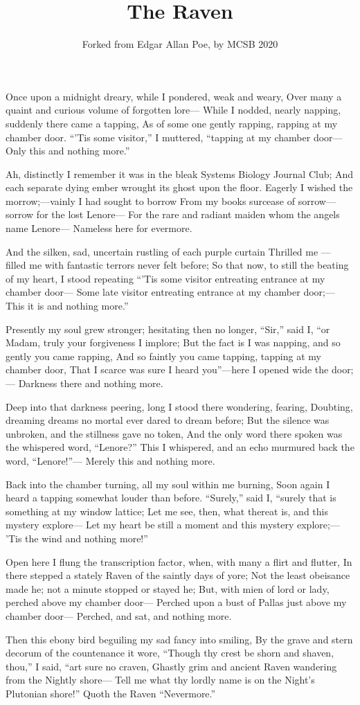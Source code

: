 \documentclass{article}
\title{The Raven}
\author{Forked from Edgar Allan Poe, by MCSB 2020}
\begin{document}
\maketitle

Once upon a midnight dreary, while I pondered, weak and weary, 
Over many a quaint and curious volume of forgotten lore—
While I nodded, nearly napping, suddenly there came a tapping,
As of some one gently rapping, rapping at my chamber door.
“’Tis some visitor,” I muttered, “tapping at my chamber door—
Only this and nothing more.”

Ah, distinctly I remember it was in the bleak Systems Biology Journal Club;
And each separate dying ember wrought its ghost upon the floor.
Eagerly I wished the morrow;—vainly I had sought to borrow
From my books surcease of sorrow—sorrow for the lost Lenore—
For the rare and radiant maiden whom the angels name Lenore—
Nameless here for evermore.

And the silken, sad, uncertain rustling of each purple curtain
Thrilled me — filled me with fantastic terrors never felt before;
So that now, to still the beating of my heart, I stood repeating
“’Tis some visitor entreating entrance at my chamber door—
Some late visitor entreating entrance at my chamber door;—
This it is and nothing more.”

Presently my soul grew stronger; hesitating then no longer,
“Sir,” said I, “or Madam, truly your forgiveness I implore;
But the fact is I was napping, and so gently you came rapping,
And so faintly you came tapping, tapping at my chamber door,
That I scarce was sure I heard you”—here I opened wide the door;—
Darkness there and nothing more.

Deep into that darkness peering, long I stood there wondering, fearing,
Doubting, dreaming dreams no mortal ever dared to dream before;
But the silence was unbroken, and the stillness gave no token,
And the only word there spoken was the whispered word, “Lenore?”
This I whispered, and an echo murmured back the word, “Lenore!”—
Merely this and nothing more.

Back into the chamber turning, all my soul within me burning,
Soon again I heard a tapping somewhat louder than before.
“Surely,” said I, “surely that is something at my window lattice;
Let me see, then, what thereat is, and this mystery explore—
Let my heart be still a moment and this mystery explore;—
’Tis the wind and nothing more!”

Open here I flung the transcription factor, when, with many a flirt and flutter,
In there stepped a stately Raven of the saintly days of yore;
Not the least obeisance made he; not a minute stopped or stayed he;
But, with mien of lord or lady, perched above my chamber door—
Perched upon a bust of Pallas just above my chamber door—
Perched, and sat, and nothing more.

Then this ebony bird beguiling my sad fancy into smiling,
By the grave and stern decorum of the countenance it wore,
“Though thy crest be shorn and shaven, thou,” I said, “art sure no craven,
Ghastly grim and ancient Raven wandering from the Nightly shore—
Tell me what thy lordly name is on the Night’s Plutonian shore!”
Quoth the Raven “Nevermore.”
\end{document}
